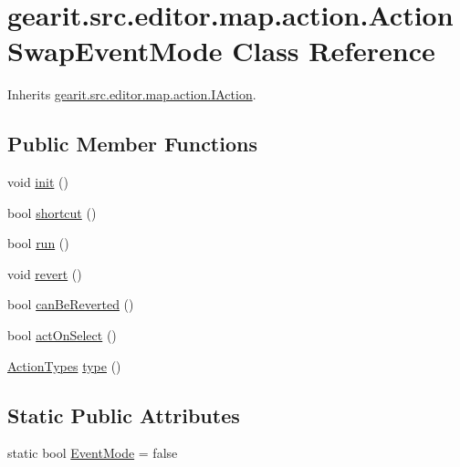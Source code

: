 \hypertarget{classgearit_1_1src_1_1editor_1_1map_1_1action_1_1_action_swap_event_mode}{\section{gearit.\+src.\+editor.\+map.\+action.\+Action\+Swap\+Event\+Mode Class Reference}
\label{classgearit_1_1src_1_1editor_1_1map_1_1action_1_1_action_swap_event_mode}
}


Inherits \hyperlink{interfacegearit_1_1src_1_1editor_1_1map_1_1action_1_1_i_action}{gearit.\+src.\+editor.\+map.\+action.\+I\+Action}.

\subsection*{Public Member Functions}
\begin{DoxyCompactItemize}
\item 
void \hyperlink{classgearit_1_1src_1_1editor_1_1map_1_1action_1_1_action_swap_event_mode_a91c8ccee848f5da6ebe312667e961b82}{init} ()
\item 
bool \hyperlink{classgearit_1_1src_1_1editor_1_1map_1_1action_1_1_action_swap_event_mode_add176ac11b4bfd239f797ebd91dbda66}{shortcut} ()
\item 
bool \hyperlink{classgearit_1_1src_1_1editor_1_1map_1_1action_1_1_action_swap_event_mode_ac392953c11c5f3ab8d34e0bb11a150e3}{run} ()
\item 
void \hyperlink{classgearit_1_1src_1_1editor_1_1map_1_1action_1_1_action_swap_event_mode_ae73b46f8df4cb6aa6d4fae6963140302}{revert} ()
\item 
bool \hyperlink{classgearit_1_1src_1_1editor_1_1map_1_1action_1_1_action_swap_event_mode_ad96e812b25a02bcc1fbf0c8600f151cc}{can\+Be\+Reverted} ()
\item 
bool \hyperlink{classgearit_1_1src_1_1editor_1_1map_1_1action_1_1_action_swap_event_mode_a710233eef775eff1185be9da1cab236b}{act\+On\+Select} ()
\item 
\hyperlink{namespacegearit_1_1src_1_1editor_1_1map_1_1action_af036712a7d960b13d1e31954e65c00e3}{Action\+Types} \hyperlink{classgearit_1_1src_1_1editor_1_1map_1_1action_1_1_action_swap_event_mode_ad4012c81ff03489f5e3ff4f99f41fb48}{type} ()
\end{DoxyCompactItemize}
\subsection*{Static Public Attributes}
\begin{DoxyCompactItemize}
\item 
static bool \hyperlink{classgearit_1_1src_1_1editor_1_1map_1_1action_1_1_action_swap_event_mode_a08b2aefc3457edd8ec76775d327ef1ac}{Event\+Mode} = false
\end{DoxyCompactItemize}


